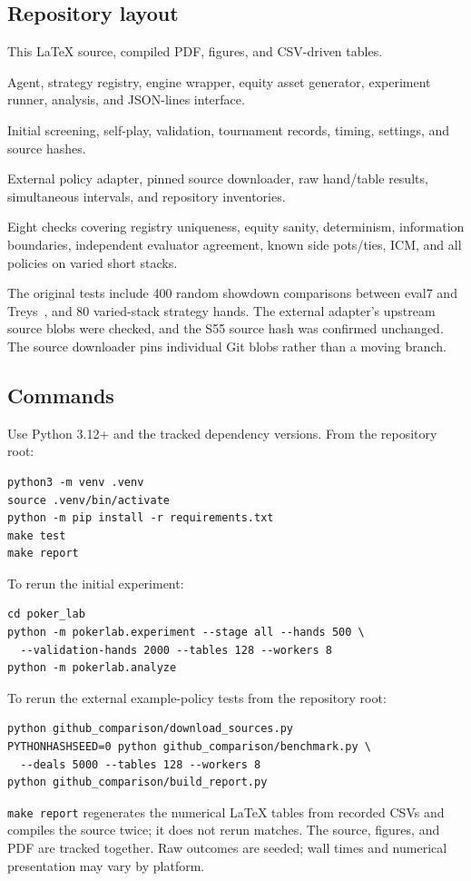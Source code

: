 \documentclass[11pt,letterpaper]{article}
\begin{document}
\subsection{Repository layout}
\begin{description}[font=\normalfont\ttfamily]
\item[report/] This LaTeX source, compiled PDF, figures, and CSV-driven tables.
\item[poker\_lab/pokerlab/] Agent, strategy registry, engine wrapper, equity
asset generator, experiment runner, analysis, and JSON-lines interface.
\item[poker\_lab/results/] Initial screening, self-play, validation,
tournament records, timing, settings, and source hashes.
\item[github\_comparison/] External policy adapter, pinned source downloader,
raw hand/table results, simultaneous intervals, and repository inventories.
\item[poker\_lab/tests/] Eight checks covering registry uniqueness, equity
sanity, determinism, information boundaries, independent evaluator agreement,
known side pots/ties, ICM, and all policies on varied short stacks.
\end{description}

The original tests include 400 random showdown comparisons between eval7
and Treys~\cite{treys}, and 80 varied-stack strategy hands. The external
adapter's upstream source blobs were checked, and the S55 source hash was
confirmed unchanged. The source downloader pins individual Git blobs rather
than a moving branch.

\subsection{Commands}
Use Python 3.12+ and the tracked dependency versions. From the repository root:
\begin{verbatim}
python3 -m venv .venv
source .venv/bin/activate
python -m pip install -r requirements.txt
make test
make report
\end{verbatim}
To rerun the initial experiment:
\begin{verbatim}
cd poker_lab
python -m pokerlab.experiment --stage all --hands 500 \
  --validation-hands 2000 --tables 128 --workers 8
python -m pokerlab.analyze
\end{verbatim}
To rerun the external example-policy tests from the repository root:
\begin{verbatim}
python github_comparison/download_sources.py
PYTHONHASHSEED=0 python github_comparison/benchmark.py \
  --deals 5000 --tables 128 --workers 8
python github_comparison/build_report.py
\end{verbatim}
\texttt{make report} regenerates the numerical LaTeX tables from recorded
CSVs and compiles the source twice; it does not rerun matches. The source,
figures, and PDF are tracked together. Raw outcomes are seeded; wall times
and numerical presentation may vary by platform.
\end{document}
